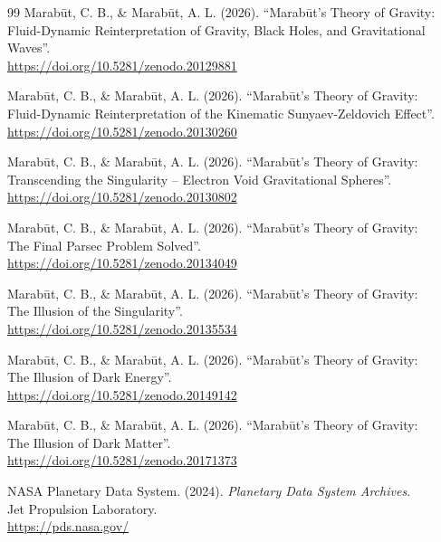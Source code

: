 \documentclass[11pt, a4paper, table]{article}
\begin{document}
\begin{thebibliography}{99}
  Marab\={u}t, C. B., \& Marab\={u}t, A. L. (2026). ``Marab\={u}t's Theory of Gravity: \\
  Fluid-Dynamic Reinterpretation of Gravity, Black Holes, and Gravitational Waves''. \\ \url{https://doi.org/10.5281/zenodo.20129881}

  Marab\={u}t, C. B., \& Marab\={u}t, A. L. (2026). ``Marab\={u}t's Theory of Gravity: \\
  Fluid-Dynamic Reinterpretation of the Kinematic Sunyaev-Zeldovich Effect''. \\
  \url{https://doi.org/10.5281/zenodo.20130260}

  Marab\={u}t, C. B., \& Marab\={u}t, A. L. (2026). ``Marab\={u}t's Theory of Gravity: \\
  Transcending the Singularity -- Electron Void Gravitational Spheres''. \\
  \url{https://doi.org/10.5281/zenodo.20130802}

  Marab\={u}t, C. B., \& Marab\={u}t, A. L. (2026). ``Marab\={u}t's Theory of Gravity: \\
  The Final Parsec Problem Solved''. \\
  \url{https://doi.org/10.5281/zenodo.20134049}

  Marab\={u}t, C. B., \& Marab\={u}t, A. L. (2026). ``Marab\={u}t's Theory of Gravity: \\
  The Illusion of the Singularity''. \\
  \url{https://doi.org/10.5281/zenodo.20135534}

  Marab\={u}t, C. B., \& Marab\={u}t, A. L. (2026). ``Marab\={u}t's Theory of Gravity: \\
  The Illusion of Dark Energy''. \\
  \url{https://doi.org/10.5281/zenodo.20149142}

  Marab\={u}t, C. B., \& Marab\={u}t, A. L. (2026). ``Marab\={u}t's Theory of Gravity: \\
  The Illusion of Dark Matter''. \\
  \url{https://doi.org/10.5281/zenodo.20171373}

   NASA Planetary Data System. (2024). \textit{Planetary Data System Archives}. \\
  Jet Propulsion Laboratory. \\
  \url{https://pds.nasa.gov/}
  
\end{thebibliography}
\end{document}
